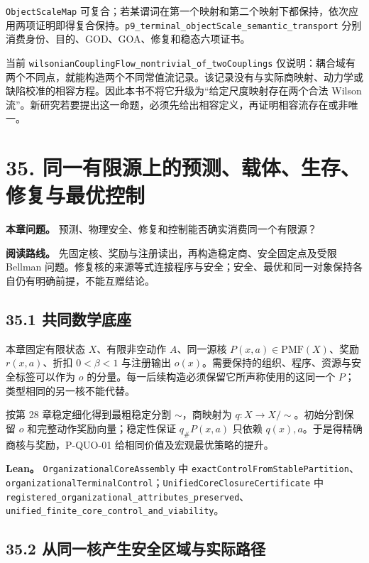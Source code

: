 \documentclass[
  11pt,
  oneside]{book}
\begin{document}
\nolinkurl{ObjectScaleMap} 可复合；若某谓词在第一个映射和第二个映射下都保持，依次应用两项证明即得复合保持。\nolinkurl{p9_terminal_objectScale_semantic_transport} 分别消费身份、目的、GOD、GOA、修复和稳态六项证书。

当前 \nolinkurl{wilsonianCouplingFlow_nontrivial_of_twoCouplings} 仅说明：耦合域有两个不同点，就能构造两个不同常值流记录。该记录没有与实际商映射、动力学或缺陷校准的相容方程。因此本书不将它升级为``给定尺度映射存在两个合法 Wilson 流''。新研究若要提出这一命题，必须先给出相容定义，再证明相容流存在或非唯一。

\chapter{35. 同一有限源上的预测、载体、生存、修复与最优控制}\label{ch-35}

\textbf{本章问题。} 预测、物理安全、修复和控制能否确实消费同一个有限源？

\textbf{阅读路线。} 先固定核、奖励与注册读出，再构造稳定商、安全固定点及受限 Bellman 问题。修复核的来源等式连接程序与安全；安全、最优和同一对象保持各自仍有明确前提，不能互赠结论。

\section{35.1 共同数学底座}\label{ux5171ux540cux6570ux5b66ux5e95ux5ea7}

本章固定有限状态 \(X\)、有限非空动作 \(A\)、同一源核 \(P(x,a)\in\mathrm{PMF}(X)\)、奖励 \(r(x,a)\)、折扣 \(0<\beta<1\) 与注册输出 \(o(x)\)。需要保持的组织、程序、资源与安全标签可以作为 \(o\) 的分量。每一后续构造必须保留它所声称使用的这同一个 \(P\)；类型相同的另一核不能代替。

按第 28 章稳定细化得到最粗稳定分割 \(\sim\)，商映射为 \(q:X\to X/{\sim}\)。初始分割保留 \(o\) 和完整动作奖励向量；稳定性保证 \(q_\#P(x,a)\) 只依赖 \(q(x),a\)。于是得精确商核与奖励，P-QUO-01 给相同价值及宏观最优策略的提升。

\textbf{Lean。} \nolinkurl{OrganizationalCoreAssembly} 中 \nolinkurl{exactControlFromStablePartition}、\nolinkurl{organizationalTerminalControl}；\nolinkurl{UnifiedCoreClosureCertificate} 中 \nolinkurl{registered_organizational_attributes_preserved}、\nolinkurl{unified_finite_core_control_and_viability}。

\section{35.2 从同一核产生安全区域与实际路径}\label{ux4eceux540cux4e00ux6838ux4ea7ux751fux5b89ux5168ux533aux57dfux4e0eux5b9eux9645ux8defux5f84}
\end{document}
